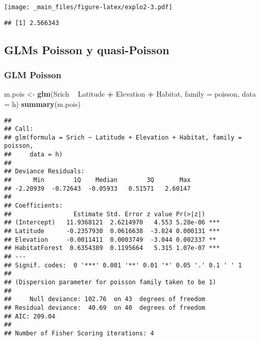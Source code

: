 \documentclass[
]{book}
\newenvironment{Shaded}{\begin{snugshade}}{\end{snugshade}}
\newcommand{\DataTypeTok}[1]{\textcolor[rgb]{0.13,0.29,0.53}{#1}}
\newcommand{\KeywordTok}[1]{\textcolor[rgb]{0.13,0.29,0.53}{\textbf{#1}}}
\newcommand{\NormalTok}[1]{#1}
\newcommand{\OperatorTok}[1]{\textcolor[rgb]{0.81,0.36,0.00}{\textbf{#1}}}
\newcommand{\StringTok}[1]{\textcolor[rgb]{0.31,0.60,0.02}{#1}}
\begin{document}
\texttt{[image: \_main\_files/figure-latex/explo2-3.pdf]}

\begin{Shaded}
\end{Shaded}

\begin{verbatim}
## [1] 2.566343
\end{verbatim}

\hypertarget{glms-poisson-y-quasi-poisson}{%
\subsection{GLMs Poisson y quasi-Poisson}\label{glms-poisson-y-quasi-poisson}}

\hypertarget{glm-poisson}{%
\subsubsection{GLM Poisson}\label{glm-poisson}}

\begin{Shaded}
\begin{Highlighting}[]
\NormalTok{m.pois <-}\StringTok{ }\KeywordTok{glm}\NormalTok{(Srich }\OperatorTok{~}\StringTok{ }\NormalTok{Latitude }\OperatorTok{+}\StringTok{ }\NormalTok{Elevation }\OperatorTok{+}\StringTok{ }\NormalTok{Habitat, }\DataTypeTok{family =}\NormalTok{ poisson, }\DataTypeTok{data =}\NormalTok{ h)}
\KeywordTok{summary}\NormalTok{(m.pois)}
\end{Highlighting}
\end{Shaded}

\begin{verbatim}
## 
## Call:
## glm(formula = Srich ~ Latitude + Elevation + Habitat, family = poisson, 
##     data = h)
## 
## Deviance Residuals: 
##      Min        1Q    Median        3Q       Max  
## -2.20939  -0.72643  -0.05933   0.51571   2.60147  
## 
## Coefficients:
##                 Estimate Std. Error z value Pr(>|z|)    
## (Intercept)   11.9368121  2.6214970   4.553 5.28e-06 ***
## Latitude      -0.2357930  0.0616638  -3.824 0.000131 ***
## Elevation     -0.0011411  0.0003749  -3.044 0.002337 ** 
## HabitatForest  0.6354389  0.1195664   5.315 1.07e-07 ***
## ---
## Signif. codes:  0 '***' 0.001 '**' 0.01 '*' 0.05 '.' 0.1 ' ' 1
## 
## (Dispersion parameter for poisson family taken to be 1)
## 
##     Null deviance: 102.76  on 43  degrees of freedom
## Residual deviance:  40.69  on 40  degrees of freedom
## AIC: 209.04
## 
## Number of Fisher Scoring iterations: 4
\end{verbatim}
\end{document}
